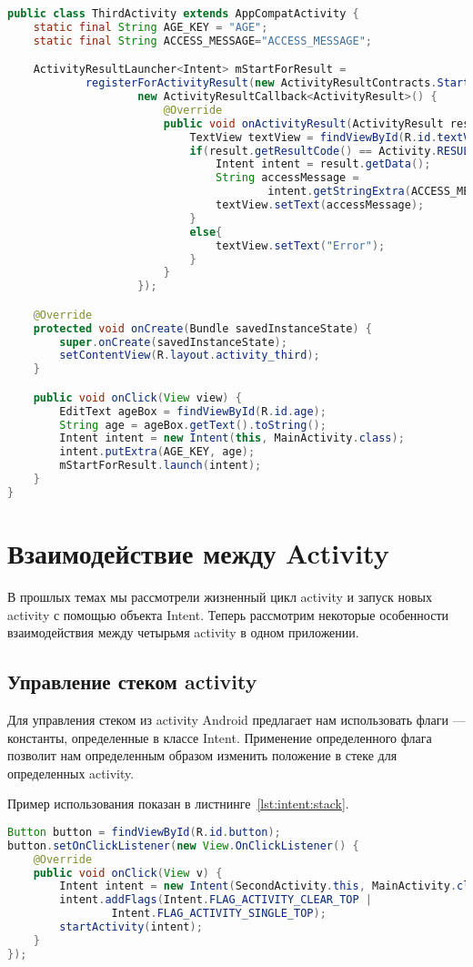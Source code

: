 \begin{lstlisting}[language=Java
	, caption=\leftline{}
	, label=lst:activity_result
	]
public class ThirdActivity extends AppCompatActivity {
	static final String AGE_KEY = "AGE";
	static final String ACCESS_MESSAGE="ACCESS_MESSAGE";

	ActivityResultLauncher<Intent> mStartForResult =
			registerForActivityResult(new ActivityResultContracts.StartActivityForResult(),
					new ActivityResultCallback<ActivityResult>() {
						@Override
						public void onActivityResult(ActivityResult result) {
							TextView textView = findViewById(R.id.textView);
							if(result.getResultCode() == Activity.RESULT_OK){
								Intent intent = result.getData();
								String accessMessage =
										intent.getStringExtra(ACCESS_MESSAGE);
								textView.setText(accessMessage);
							}
							else{
								textView.setText("Error");
							}
						}
					});

	@Override
	protected void onCreate(Bundle savedInstanceState) {
		super.onCreate(savedInstanceState);
		setContentView(R.layout.activity_third);
	}

	public void onClick(View view) {
		EditText ageBox = findViewById(R.id.age);
		String age = ageBox.getText().toString();
		Intent intent = new Intent(this, MainActivity.class);
		intent.putExtra(AGE_KEY, age);
		mStartForResult.launch(intent);
	}
}
\end{lstlisting}

\section{Взаимодействие между Activity}
В прошлых темах мы рассмотрели жизненный цикл activity и запуск новых
activity с помощью объекта Intent. Теперь рассмотрим некоторые
особенности взаимодействия между четырьмя activity в одном приложении.

\subsection{Управление стеком activity}
Для управления стеком из activity Android предлагает нам использовать
флаги --- константы, определенные в классе Intent. Применение
определенного флага позволит нам определенным образом изменить
положение в стеке для определенных activity.\par
Пример использования показан в листнинге~\ref{lst:intent:stack}.

\begin{lstlisting}[language=Java
	, caption=\leftline{}
	, label=lst:intent:stack
	]
Button button = findViewById(R.id.button);
button.setOnClickListener(new View.OnClickListener() {
	@Override
	public void onClick(View v) {
		Intent intent = new Intent(SecondActivity.this, MainActivity.class);
		intent.addFlags(Intent.FLAG_ACTIVITY_CLEAR_TOP |
				Intent.FLAG_ACTIVITY_SINGLE_TOP);
		startActivity(intent);
	}
});
\end{lstlisting}

